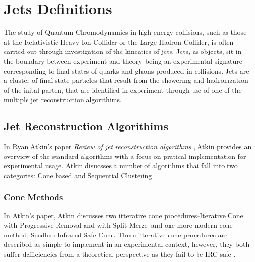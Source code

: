 %
\section{Jets Definitions}
The study of Quantum Chromodynamics in high energy collisions, such as those at the Relativistic Heavy Ion Collider or the Large Hadron Collider, is often carried out through investigation of the kineatics of jets.
Jets, as objects, sit in the boundary between experiment and theory, being an experimental signature corresponding to final states of quarks and gluons produced in collisions. 
Jets are a cluster of final state particles that result from the showering and hadronization of the inital parton, that are identified in experiment through use of one of the multiple jet reconstruction algorithims. 
\subsection{Jet Reconstruction Algorithims}
In Ryan Atkin's paper \textit{Review of jet reconstruction algorithms} \cite{Atkin2015}, Atkin provides an overview of the standard algorithms with a focus on pratical implementation for experimental usage. %
Atkin disucsses a number of algorithms that fall into two categories: Cone based and Sequential Clustering 
\subsubsection{Cone Methods}
	In Atkin's paper, Atkin discusses two itterative cone procedures--Iterative Cone with Progressive Removal and with Split Merge--and one more modern cone method, Seedless Infrared Safe Cone. 
	These itterative cone procedures are described as simple to implement in an experimental context, however, they both suffer defficiencies from a theoretical perspective as they fail to be IRC safe \cite{Atkin2015} \cite{Salam2007}.
